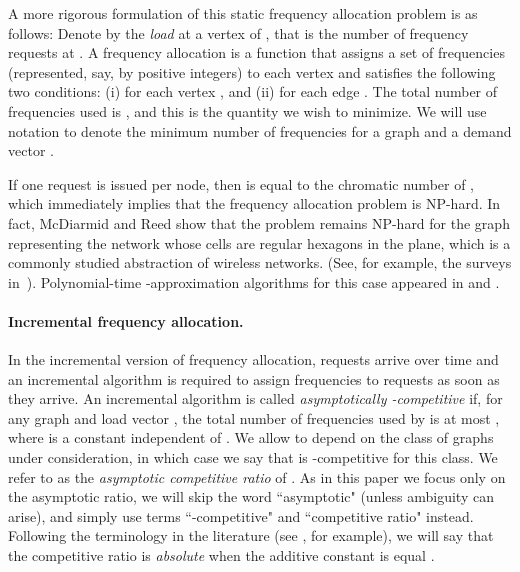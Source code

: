 \documentclass[11pt]{article}
\newcommand{\NP}{{\textsf{NP}}}
\begin{document}
A more rigorous formulation of this static frequency allocation problem is
as follows: Denote by  the \emph{load} at a vertex  of , that is
the number of frequency requests at . A frequency allocation is
a function that assigns a set  of frequencies (represented, say, by
positive integers) to each vertex 
and satisfies the following two conditions: 
(i)  for each vertex , and
(ii)  for each edge .
The total number of frequencies used is , and this
is the quantity we wish to minimize. We will use notation
 to denote the minimum number of frequencies 
for a graph  and a demand vector .

If one request is issued per node, then  is equal to the
chromatic number of , which immediately implies that the frequency
allocation problem is {\NP}-hard. In fact,
McDiarmid and Reed \cite{McDRee00} show that the problem remains {\NP}-hard
for the graph representing the network whose cells are regular
hexagons in the plane, which is a commonly studied abstraction of
wireless networks. (See, for example,
the surveys in~\cite{Murthy-etal99,Aardal-etal03}).
Polynomial-time -approximation algorithms for this
case appeared in \cite{McDRee00} and \cite{NarShe01}.



\paragraph{Incremental frequency allocation.}
In the incremental version of frequency allocation, requests arrive over time and 
an incremental algorithm is required to assign frequencies to requests
as soon as they arrive. An incremental algorithm  is called
\emph{asymptotically -competitive} if, for any graph  and load vector ,
the total number of frequencies 
used by  is at most , where  is a constant
independent of . We allow  to depend on the class of graphs under 
consideration, in which case we say that  is -competitive for this class.
We refer to  as the \emph{asymptotic competitive ratio} of . As in this paper
we focus only on the asymptotic ratio, we will skip the word
``asymptotic" (unless ambiguity can arise), and simply use
terms ``-competitive" and ``competitive ratio" instead. Following
the terminology in the literature (see \cite{ChChYZ07,ChChYZ10}, for example),
we will say that the 
competitive ratio is \emph{absolute} when the additive constant
 is equal .
\end{document}
